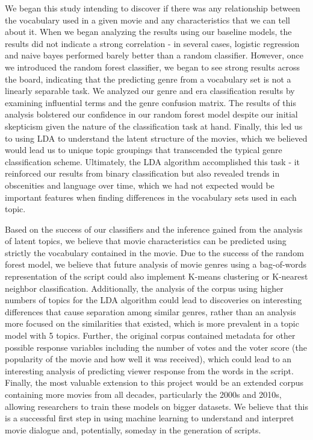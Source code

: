 \documentclass{article} %
\begin{document}
We began this study intending to discover if there was any relationship between the vocabulary used in a given movie and any characteristics that we can tell about it. When we began analyzing the results using our baseline models, the results did not indicate a strong correlation - in several cases, logistic regression and naive bayes performed barely better than a random classifier. However, once we introduced the random forest classifier, we began to see strong results across the board, indicating that the predicting genre from a vocabulary set is not a linearly separable task. We analyzed our genre and era classification results by examining influential terms and the genre confusion matrix. The results of this analysis bolstered our confidence in our random forest model despite our initial skepticism given the nature of the classification task at hand. Finally, this led us to using LDA to understand the latent structure of the movies, which we believed would lead us to unique topic groupings that transcended the typical genre classification scheme. Ultimately, the LDA algorithm accomplished this task - it reinforced our results from binary classification but also revealed trends in obscenities and language over time, which we had not expected would be important features when finding differences in the vocabulary sets used in each topic.

Based on the success of our classifiers and the inference gained from the analysis of latent topics, we believe that movie characteristics can be predicted using strictly the vocabulary contained in the movie. Due to the success of the random forest model, we believe that future analysis of movie genres using a bag-of-words representation of the script could also implement K-means clustering or K-nearest neighbor classification. Additionally, the analysis of the corpus using higher numbers of topics for the LDA algorithm could lead to discoveries on interesting differences that cause separation among similar genres, rather than an analysis more focused on the similarities that existed, which is more prevalent in a topic model with 5 topics. Further, the original corpus contained metadata for other possible response variables including the number of votes and the voter score (the popularity of the movie and how well it was received), which could lead to an interesting analysis of predicting viewer response from the words in the script. Finally, the most valuable extension to this project would be an extended corpus containing more movies from all decades, particularly the 2000s and 2010s, allowing researchers to train these models on bigger datasets. We believe that this is a successful first step in using machine learning to understand and interpret movie dialogue and, potentially, someday in the generation of scripts.



\end{document}
